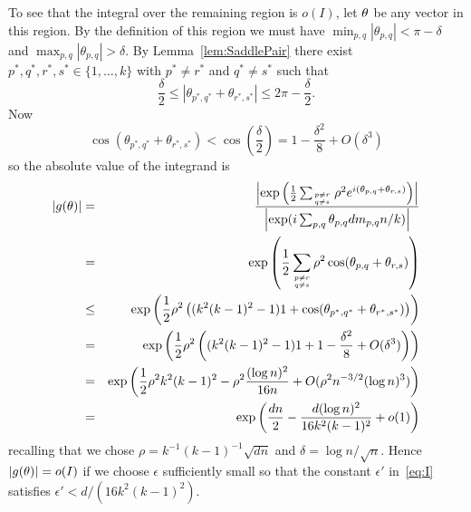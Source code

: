 \documentclass[12pt]{article}
\def\vtheta{{\bf \theta}}
\begin{document}
To see that the integral over the remaining region is $o(I)$,
let $\vtheta$ be any vector in this region. By the definition of this region
we must have $\min_{p,q}|\theta_{p,q}|<\pi-\delta$ 
and $\max_{p,q}|\theta_{p,q}|> \delta$.
By Lemma~\ref{lem:SaddlePair}
there exist $p^*, q^*, r^*, s^*\in\{1, \ldots, k\}$ 
with $p^*\ne r^*$ and $q^*\ne s^*$ 
such that 
\[
\frac{\delta}{2} \le |\theta_{p^*,q^*}+\theta_{r^*,s^*}| \le 2\pi - \frac{\delta}{2}.
\]
Now
\[
\cos(\theta_{p^*,q^*}+\theta_{r^*,s^*})< \cos\left(\frac{\delta}{2}\right)
= 1 - \frac{\delta^2}{8} + O(\delta^3)
\]
so the absolute value of the integrand is
\begin{eqnarray*}
|g(\vtheta)|
&=&
\frac{\left|\exp\left(\frac{1}{2}
\sum_{p\ne r \atop q\ne s}
\rho^2 e^{i(\theta_{p,q}+\theta_{r,s})}\right)
\right|}{\left|\exp(i\sum_{p,q}\theta_{p,q}dm_{p,q}n/k)\right|}\\
&=&
\exp\left(\frac{1}{2}
\sum_{p\ne r \atop q\ne s}
\rho^2 \cos(\theta_{p,q}+\theta_{r,s})\right)\\
&\le&
\exp\left(\frac{1}{2}
\rho^2 \left((k^2(k-1)^2-1)1 + \cos(\theta_{p^*,q^*}+\theta_{r^*,s^*})\right)\right)\\
&=&
\exp\left(\frac{1}{2}
\rho^2 \left((k^2(k-1)^2-1)1 +  
1 - \frac{\delta^2}{8} + O(\delta^3)\right)
\right)\\
&=&
\exp\left(\frac{1}{2}
\rho^2 k^2(k-1)^2 -  
\rho^2\frac{(\log n)^2}{16n} + O(\rho^2 n^{-3/2}(\log n)^3)
\right)\\
&=&
\exp\left(
\frac{dn}{2}
-\frac{d(\log n)^2}{16k^2(k-1)^2} + o(1)
\right)%
\end{eqnarray*}
recalling that we chose $\rho = k^{-1}(k-1)^{-1}\sqrt{dn}$ and
$\delta = \log n / \sqrt{n}$.
Hence $|g(\vtheta)|=o(I)$ if we choose 
$\epsilon$ sufficiently small so that the constant $\epsilon'$ in~\eqref{eq:I} satisfies $\epsilon' < d/\left(16k^2(k-1)^2\right)$.
\end{document}
